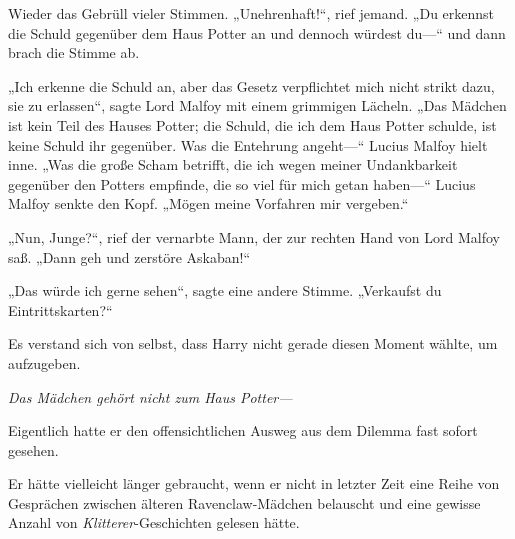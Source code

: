 Wieder das Gebrüll vieler Stimmen.
„Unehrenhaft!“, rief jemand.
„Du erkennst die Schuld gegenüber dem Haus Potter an und dennoch würdest du—“ und dann brach die Stimme ab.

„Ich erkenne die Schuld an, aber das Gesetz verpflichtet mich nicht strikt dazu, sie zu erlassen“, sagte Lord Malfoy mit einem grimmigen Lächeln.
„Das Mädchen ist kein Teil des Hauses Potter; die Schuld, die ich dem Haus Potter schulde, ist keine Schuld ihr gegenüber. Was die Entehrung angeht—“ Lucius Malfoy hielt inne.
„Was die große Scham betrifft, die ich wegen meiner Undankbarkeit gegenüber den Potters empfinde, die so viel für mich getan haben—“
Lucius Malfoy senkte den Kopf.
„Mögen meine Vorfahren mir vergeben.“

„Nun, Junge?“, rief der vernarbte Mann, der zur rechten Hand von Lord Malfoy saß.
„Dann geh und zerstöre Askaban!“

„Das würde ich gerne sehen“, sagte eine andere Stimme.
„Verkaufst du Eintrittskarten?“

Es verstand sich von selbst, dass Harry nicht gerade diesen Moment wählte, um aufzugeben.

\emph{Das Mädchen gehört nicht zum Haus Potter—}

Eigentlich hatte er den offensichtlichen Ausweg aus dem Dilemma fast sofort gesehen.

Er hätte vielleicht länger gebraucht, wenn er nicht in letzter Zeit eine Reihe von Gesprächen zwischen älteren Ravenclaw-Mädchen belauscht und eine gewisse Anzahl von \emph{Klitterer}-Geschichten gelesen hätte.

